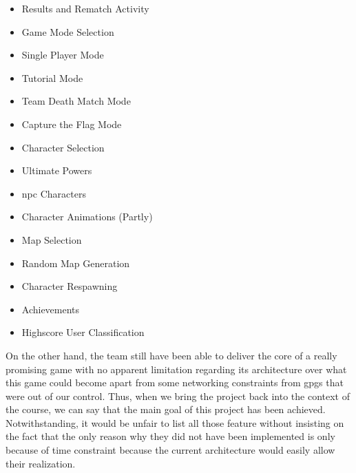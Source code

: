 \begin{multicols}{2}
  \begin{itemize}
    \item Results and Rematch Activity
    \item Game Mode Selection
    \item Single Player Mode
    \item Tutorial Mode
    \item Team Death Match Mode
    \item Capture the Flag Mode
    \item Character Selection
    \item Ultimate Powers
    \item \gls{npc} Characters
    \item Character Animations (Partly)
    \item Map Selection
    \item Random Map Generation
    \item Character Respawning
    \item Achievements
    \item Highscore User Classification
  \end{itemize}
\end{multicols}

On the other hand, the team still have been able to deliver the core of a really promising game with no apparent limitation regarding its architecture over what this game could become apart from some networking constraints from \gls{gpgs} that were out of our control. Thus, when we bring the project back into the context of the course, we can say that the main goal of this project has been achieved. Notwithstanding, it would be unfair to list all those feature without insisting on the fact that the only reason why they did not have been implemented is only because of time constraint because the current architecture would easily allow their realization.
